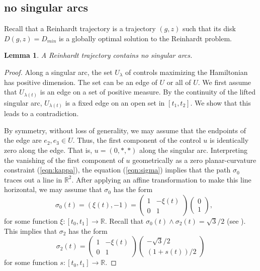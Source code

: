 \documentclass{article}
\newtheorem{lemma}[theorem]{Lemma}
\theoremstyle{remark}
\newcommand{\ring}[1]{\mathbb{#1}}
\def\DR{D_{min}}
\begin{document}
\subsection{no singular arcs}

Recall that a Reinhardt trajectory is a trajectory $(g,z)$ such
that its disk $D(g,z)=\DR$ is a globally optimal solution to the
Reinhardt problem.

\begin{lemma} A Reinhardt trajectory contains no
singular arcs.
\end{lemma}

\begin{proof} Along a singular arc, the set $U_\lambda$ 
of controls maximizing the Hamiltonian has positive dimension.
The set can be an edge of $U$ or all of $U$.
%
We first assume that $U_{\lambda(t)}$ is an edge on a set 
of positive measure.
By the continuity of the lifted singular arc,  $U_{\lambda(t)}$
is a fixed edge on an open set in $[t_1,t_2]$.
We show that this leads to a contradiction.

By symmetry, without loss of generality, we may assume
that the endpoints of the edge are $e_2,e_3\in U$.
Thus, the first component of the control $u$ is identically zero along
the edge.  That is, $u=(0,*,*)$ along the singular arc.  Interpreting
the vanishing of the first component of $u$ geometrically as a zero
planar-curvature constraint (\ref{eqn:kappa}), the equation
(\ref{eqn:sigma}) implies that the path $\sigma_0$ traces out a line
in $\ring{R}^2$.  After applying an affine transformation to make this
line horizontal, we may assume that $\sigma_0$ has the form
\[
\quad \sigma_0(t) = (\xi(t),-1) = 
\begin{pmatrix} 1 & -\xi(t) \\ 0 &1\end{pmatrix} 
\begin{pmatrix} 0\\1\end{pmatrix},
\]
for some function $\xi:[t_0,t_1]\to \ring{R}$.  Recall that
$\sigma_0(t) \wedge \sigma_2(t) = \sqrt{3}/2$ (see
\cite[\S3.2]{hales2011reinhardt}).  This implies
that $\sigma_2$ has the form
\[
\sigma_2(t) = \begin{pmatrix} 1 & -\xi(t) \\ 0 &1\end{pmatrix} 
\begin{pmatrix} -\sqrt{3}/2 \\ (1+s(t))/2\end{pmatrix}
\]
for some function $s:[t_0,t_1]\to \ring{R}$.


\end{proof}
\end{document}
